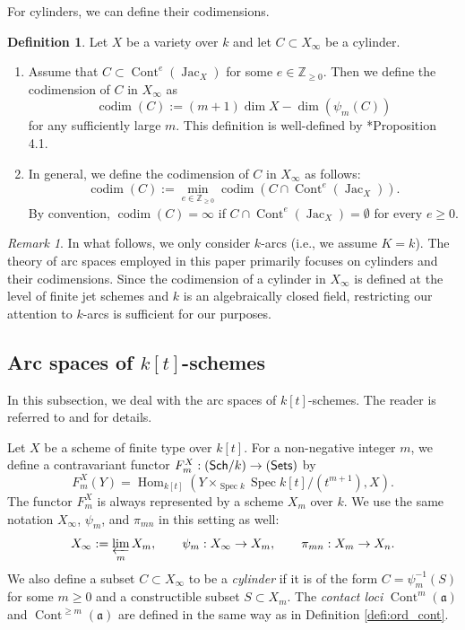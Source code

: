 \documentclass[a4paper,11pt]{amsart}
\theoremstyle{definition}
\newtheorem{defi}[thm]{Definition}
\theoremstyle{remark}
\newtheorem{rmk}[thm]{Remark}
\begin{document}
For cylinders, we can define their codimensions. 
\begin{defi}\label{defi:codim_k}
Let $X$ be a variety over $k$ and let $C \subset X_{\infty}$ be a cylinder. 
\begin{enumerate}
\item 
Assume that $C \subset \operatorname{Cont}^e(\operatorname{Jac}_X)$ for some $e \in \mathbb{Z}_{\ge 0}$.
Then we define the codimension of $C$ in $X_\infty$ as 
\[
\operatorname{codim}(C):=(m+1)\operatorname{dim}X-\operatorname{dim} \left( \psi_m(C) \right)
\]
for any sufficiently large $m$. This definition is well-defined by \cite{EM09}*{Proposition 4.1}.

\item 
In general, we define the codimension of $C$ in $X_\infty$ as follows:
\[
\operatorname{codim}(C):=\min_{e\in\mathbb Z_{\ge 0}} \operatorname{codim} \left( C\cap \operatorname{Cont}^e(\operatorname{Jac}_X) \right). 
\]
By convention, $\operatorname{codim}(C) = \infty$ if $C \cap \operatorname{Cont}^e \left( \operatorname{Jac} _{X} \right) = \emptyset$
for every $e \ge 0$. 
\end{enumerate}
\end{defi}

\begin{rmk}
In what follows, we only consider $k$-arcs (i.e., we assume $K=k$). 
The theory of arc spaces employed in this paper primarily focuses on cylinders and their codimensions. Since the codimension of a cylinder in $X_\infty$ is defined at the level of finite jet schemes and $k$ is an algebraically closed field, 
restricting our attention to $k$-arcs is sufficient for our purposes.
\end{rmk}


\subsection{Arc spaces of $k[t]$-schemes}\label{subsection:arc2}
In this subsection, we deal with the arc spaces of $k[t]$-schemes. 
The reader is referred to \cite{DL02} and \cite{NS22} for details.

Let $X$ be a scheme of finite type  over $k[t]$. 
For a non-negative integer $m$, we define a contravariant functor $F^X_{m}: ({\sf Sch}/k) \to ({\sf Sets})$ by 
\[
F^X _{m}(Y) = \operatorname{Hom} _{k[t]} \left( Y \times_{\operatorname{Spec} k} \operatorname{Spec} k[t]/(t^{m+1}), X \right).
\]
The functor $F^X_{m}$ is always represented by a scheme $X_m$ over $k$. 
We use the same notation $X_{\infty}$, $\psi_m$, and $\pi_{mn}$ in this setting as well: 
\[
X_\infty := \mathop{\varprojlim}\limits_{m} X_m, \qquad \psi_{m}:X_{\infty} \to X_m, \qquad \pi_{mn}:X_m \to X_n. 
\]
We also define a subset $C \subset X_{\infty}$ to be a \textit{cylinder} if it is of the form $C = \psi_{m}^{-1}(S)$ for some $m \ge 0$ and a constructible subset $S \subset X_m$. 
The \textit{contact loci} $\operatorname{Cont}^{m}(\mathfrak{a})$ and $\operatorname{Cont}^{\ge m}(\mathfrak{a})$ are defined in the same way as in Definition \ref{defi:ord_cont}.
\end{document}

